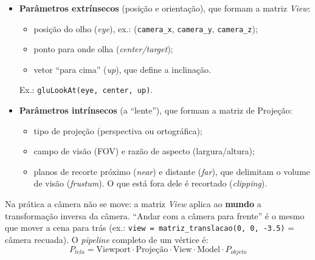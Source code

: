 \documentclass{article}
\begin{document}
\begin{itemize}
      \item \textbf{Parâmetros extrínsecos} (posição e orientação), que formam a matriz \textit{View}:
            \begin{itemize}
                  \item posição do olho (\textit{eye}), ex.: (\texttt{camera\_x}, \texttt{camera\_y}, \texttt{camera\_z});
                  \item ponto para onde olha (\textit{center/target});
                  \item vetor ``para cima'' (\textit{up}), que define a inclinação.
            \end{itemize}
            Ex.: \texttt{gluLookAt(eye, center, up)}.
      \item \textbf{Parâmetros intrínsecos} (a ``lente''), que formam a matriz de Projeção:
            \begin{itemize}
                  \item tipo de projeção (perspectiva ou ortográfica);
                  \item campo de visão (FOV) e razão de aspecto (largura/altura);
                  \item planos de recorte próximo (\textit{near}) e distante (\textit{far}), que delimitam o volume de visão (\textit{frustum}). O que está fora dele é recortado (\textit{clipping}).
            \end{itemize}
\end{itemize}

Na prática a câmera não se move: a matriz \textit{View} aplica ao \textbf{mundo} a transformação inversa da câmera. ``Andar com a câmera para frente'' é o mesmo que mover a cena para trás (ex.: \texttt{view = matriz\_translacao(0, 0, -3.5)} = câmera recuada). O \textit{pipeline} completo de um vértice é:
\[
      P_{tela} = \text{Viewport} \cdot \text{Projeção} \cdot \text{View} \cdot \text{Model} \cdot P_{objeto}
\]
\end{document}
